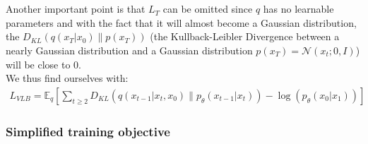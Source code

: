 \documentclass{article}
\begin{document}
\\\\
Another important point is that $L_T$ can be omitted since $q$ has no learnable parameters and with the fact that it will almost become a Gaussian distribution, the $D_{KL}\left(q\left(x_T | x_0\right) \| p\left(x_T\right)\right)$ (the Kullback-Leibler Divergence between a nearly Gaussian distribution and a Gaussian distribution $p\left(x_T\right) = \mathcal{N}\left(x_t; 0, I\right)$) will be close to 0. \cite{ho2020denoising} \\
We thus find ourselves with:
\begin{gather}
  L_{VLB} = \mathbb{E}_q \left[ \sum_{t \geq 2} D_{KL}\left(q\left(x_{t-1} | x_t, x_0\right) \| p_{\theta}\left(x_{t-1} | x_t\right)\right) - \log\left(p_{\theta}\left(x_0 | x_1\right)\right) \right]
\end{gather}

\subsubsection{Simplified training objective}
\end{document}
